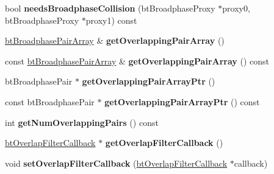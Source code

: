 \begin{DoxyCompactItemize}
\item 
\hypertarget{classbt_sorted_overlapping_pair_cache_a5acec9d0949bd1a46db723052e261749}{bool {\bfseries needs\+Broadphase\+Collision} (bt\+Broadphase\+Proxy $\ast$proxy0, bt\+Broadphase\+Proxy $\ast$proxy1) const }\label{classbt_sorted_overlapping_pair_cache_a5acec9d0949bd1a46db723052e261749}

\item 
\hypertarget{classbt_sorted_overlapping_pair_cache_ae71e7fdb0e6bc39334d960a645cc1042}{\hyperlink{classbt_aligned_object_array}{bt\+Broadphase\+Pair\+Array} \& {\bfseries get\+Overlapping\+Pair\+Array} ()}\label{classbt_sorted_overlapping_pair_cache_ae71e7fdb0e6bc39334d960a645cc1042}

\item 
\hypertarget{classbt_sorted_overlapping_pair_cache_a6ea5468d6595c0d3cd15a7a8df677aba}{const \hyperlink{classbt_aligned_object_array}{bt\+Broadphase\+Pair\+Array} \& {\bfseries get\+Overlapping\+Pair\+Array} () const }\label{classbt_sorted_overlapping_pair_cache_a6ea5468d6595c0d3cd15a7a8df677aba}

\item 
\hypertarget{classbt_sorted_overlapping_pair_cache_a11d3a6e1e0ffacc51fb8d803d3b12f83}{bt\+Broadphase\+Pair $\ast$ {\bfseries get\+Overlapping\+Pair\+Array\+Ptr} ()}\label{classbt_sorted_overlapping_pair_cache_a11d3a6e1e0ffacc51fb8d803d3b12f83}

\item 
\hypertarget{classbt_sorted_overlapping_pair_cache_a17c1c5c6b1b5b3ec7ff871d9b3458784}{const bt\+Broadphase\+Pair $\ast$ {\bfseries get\+Overlapping\+Pair\+Array\+Ptr} () const }\label{classbt_sorted_overlapping_pair_cache_a17c1c5c6b1b5b3ec7ff871d9b3458784}

\item 
\hypertarget{classbt_sorted_overlapping_pair_cache_abdd101f4a7d5becefd4b7d5bc3f12530}{int {\bfseries get\+Num\+Overlapping\+Pairs} () const }\label{classbt_sorted_overlapping_pair_cache_abdd101f4a7d5becefd4b7d5bc3f12530}

\item 
\hypertarget{classbt_sorted_overlapping_pair_cache_ac31e0bde69f0464519ae7753274681c6}{\hyperlink{structbt_overlap_filter_callback}{bt\+Overlap\+Filter\+Callback} $\ast$ {\bfseries get\+Overlap\+Filter\+Callback} ()}\label{classbt_sorted_overlapping_pair_cache_ac31e0bde69f0464519ae7753274681c6}

\item 
\hypertarget{classbt_sorted_overlapping_pair_cache_a80a1d641ded9fb21e9b4144e43bca664}{void {\bfseries set\+Overlap\+Filter\+Callback} (\hyperlink{structbt_overlap_filter_callback}{bt\+Overlap\+Filter\+Callback} $\ast$callback)}\label{classbt_sorted_overlapping_pair_cache_a80a1d641ded9fb21e9b4144e43bca664}


\end{DoxyCompactItemize}
